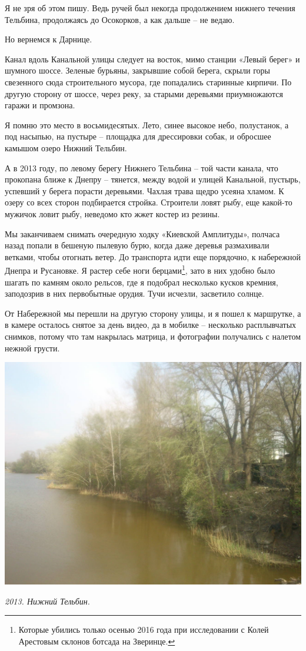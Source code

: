 Я не зря об этом пишу. Ведь ручей был некогда продолжением нижнего течения Тельбина, продолжаясь до Осокорков, а как дальше – не ведаю.

Но вернемся к Дарнице.

Канал вдоль Канальной улицы следует на восток, мимо станции «Левый берег» и шумного шоссе. Зеленые бурьяны, закрывшие собой берега, скрыли горы свезенного сюда строительного мусора, где попадались старинные кирпичи. По другую сторону от шоссе, через реку, за старыми деревьями приумножаются гаражи и промзона.

Я помню это место в восьмидесятых. Лето, синее высокое небо, полустанок, а под насыпью, на пустыре – площадка для дрессировки собак, и обросшее камышом озеро Нижний Тельбин.

А в 2013 году, по левому берегу Нижнего Тельбина –  той части канала, что прокопана ближе к Днепру – тянется, между водой и улицей Канальной, пустырь, успевший у берега порасти деревьями. Чахлая трава щедро усеяна хламом. К озеру со всех сторон подбирается стройка. Строители ловят рыбу, еще какой-то мужичок ловит рыбу, неведомо кто жжет костер из резины. 

Мы заканчиваем снимать очередную ходку «Киевской Амплитуды», полчаса назад попали в бешеную пылевую бурю, когда даже деревья размахивали ветками, чтобы отогнать ветер. До транспорта идти еще порядочно, к набережной Днепра и Русановке. Я растер себе ноги берцами\footnote{Которые убились только осенью 2016 года при исследовании с Колей Арестовым склонов ботсада на Зверинце.}, зато в них удобно было шагать по камням около рельсов, где я подобрал несколько кусков кремния, заподозрив в них первобытные орудия. Тучи исчезли, засветило солнце.

От Набережной мы перешли на другую сторону улицы, и я пошел к маршрутке, а в камере осталось снятое за день видео, да в мобилке – несколько расплывчатых снимков, потому что там накрылась матрица, и фотографии получались с налетом нежной грусти.

\begin{center}
\includegraphics[width=\linewidth]{chast-gorodki/darn/s_darnica-DSC_0028.JPG}

\textit{2013. Нижний Тельбин.}
\end{center}

